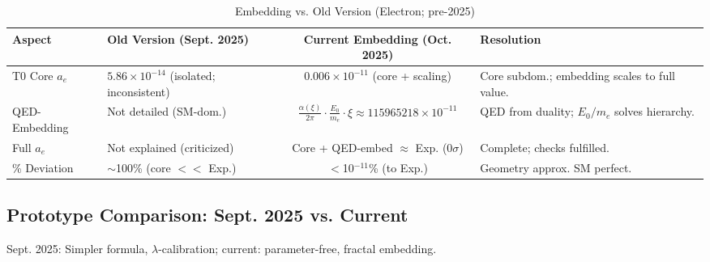 \documentclass[12pt,a4paper]{article}
\begin{document}
	\begin{table}[ht!]
		\centering
		\small
		\begin{adjustbox}{max width=\textwidth}
			\begin{tabular}{llcl}
				\toprule
				Aspect & Old Version (Sept. 2025) & Current Embedding (Oct. 2025) & Resolution \\
				\midrule
				T0 Core $a_e$ & $5.86 \times 10^{-14}$ (isolated; inconsistent) & $0.006 \times 10^{-11}$ (core + scaling) & Core subdom.; embedding scales to full value. \\
				QED-Embedding & Not detailed (SM-dom.) & $\frac{\alpha(\xi)}{2\pi} \cdot \frac{E_0}{m_e} \cdot \xi \approx 115965218 \times 10^{-11}$ & QED from duality; $E_0 / m_e$ solves hierarchy. \\
				Full $a_e$ & Not explained (criticized) & Core + QED-embed $\approx$ Exp. (0$\sigma$) & Complete; checks fulfilled. \\
				\% Deviation & $\sim$100\% (core $<<$ Exp.) & $<$10$^{-11}$\% (to Exp.) & Geometry approx. SM perfect. \\
				\bottomrule
			\end{tabular}
		\end{adjustbox}
		\caption{Embedding vs. Old Version (Electron; pre-2025)}
		\label{tab:embedding_electron}
	\end{table}
	
	\subsection{Prototype Comparison: Sept. 2025 vs. Current}
	
	Sept. 2025: Simpler formula, $\lambda$-calibration; current: parameter-free, fractal embedding.
	
\end{document}
